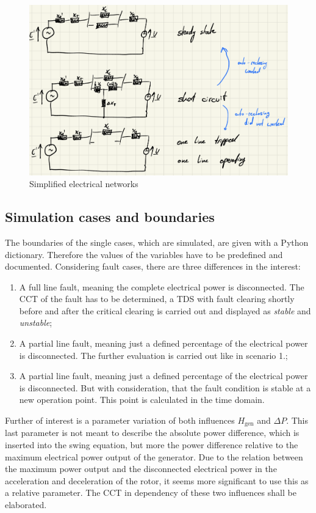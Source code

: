 \begin{figure}[H]
        \centering
        \includegraphics[width=.7\textwidth]{images/electrical_networks.png}
        \caption[Simplified electrical networks]{Simplified electrical networks}
        \label{fig:simplified-networks}
\end{figure}

\subsection{Simulation cases and boundaries}
\label{sec:sim-boundaries}

The boundaries of the single cases, which are simulated, are given with a Python dictionary. Therefore the values of the variables have to be predefined and documented. Considering fault cases, there are three differences in the interest:
\begin{enumerate}
        \item A full line fault, meaning the complete electrical power is disconnected. The \acs{CCT} of the fault has to be determined, a \acs{TDS} with fault clearing shortly before and after the critical clearing is carried out and displayed as {\itshape stable} and {\itshape unstable};
        \item A partial line fault, meaning just a defined percentage of the electrical power is disconnected. The further evaluation is carried out like in scenario 1.;
        \item A partial line fault, meaning just a defined percentage of the electrical power is disconnected. But with consideration, that the fault condition is stable at a new operation point. This point is calculated in the time domain.
\end{enumerate}
Further of interest is a parameter variation of both influences $H_\mathrm{gen}$ and $\Delta P$. This last parameter is not meant to describe the absolute power difference, which is inserted into the swing equation, but more the power difference relative to the maximum electrical power output of the generator. Due to the relation between the maximum power output and the disconnected electrical power in the acceleration and deceleration of the rotor, it seems more significant to use this as a relative parameter. The \acs{CCT} in dependency of these two influences shall be elaborated.

